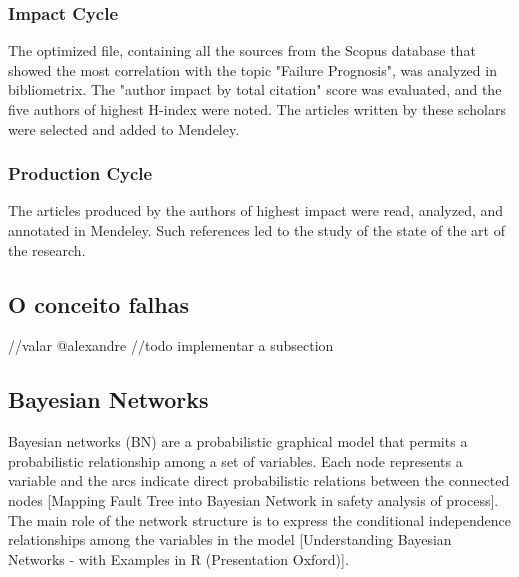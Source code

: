 \subsubsection{Impact Cycle}
The optimized file, containing all the sources from the Scopus database that showed the most correlation with the topic "Failure Prognosis", was analyzed in bibliometrix. 
The "author impact by total citation" score was evaluated, and the five authors of highest H-index were noted. The articles written by these scholars were selected and added to Mendeley.

\subsubsection{Production Cycle}
The articles produced by the authors of highest impact were read, analyzed, and annotated in Mendeley.
Such references led to the study of the state of the art of the research.

\subsection{O conceito falhas}
//valar @alexandre
//todo implementar a subsection


\subsection{Bayesian Networks}
Bayesian networks (BN) are a probabilistic graphical model that  permits  a  probabilistic  relationship  among a set of variables.  Each  node  represents  a  variable  and  the  arcs  indicate  direct probabilistic  relations  between  the  connected  nodes [Mapping Fault Tree into Bayesian Network in safety analysis of process]. The main role of the network structure is to express the conditional independence relationships among the variables in the model [Understanding Bayesian Networks - with Examples in R (Presentation Oxford)].

